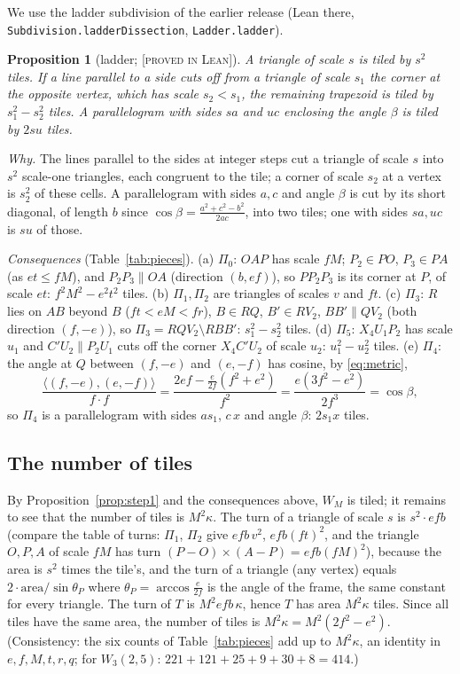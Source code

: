 \documentclass[11pt,reqno]{amsart}
\theoremstyle{plain}
\newtheorem{proposition}[theorem]{Proposition}
\theoremstyle{definition}
\newcommand{\lab}[1]{\textup{[\textsc{#1}]}}
\newcommand{\PL}{\lab{proved in Lean}}
\begin{document}
We use the ladder subdivision of the earlier release (Lean there, \texttt{Subdivision.ladderDissection}, \texttt{Ladder.ladder}).
\begin{proposition}[ladder; \PL{}]\label{prop:ladder}
A triangle of scale $s$ is tiled by $s^2$ tiles. If a line parallel to a side cuts off from a triangle of scale $s_1$ the corner at the opposite vertex, which has scale $s_2<s_1$, the remaining trapezoid is tiled by $s_1^2-s_2^2$ tiles. A parallelogram with sides $sa$ and $uc$ enclosing the angle $\beta$ is tiled by $2su$ tiles.
\end{proposition}
\noindent\emph{Why.} The lines parallel to the sides at integer steps cut a triangle of scale $s$ into $s^2$ scale-one triangles, each congruent to the tile; a corner of scale $s_2$ at a vertex is $s_2^2$ of these cells. A parallelogram with sides $a,c$ and angle $\beta$ is cut by its short diagonal, of length $b$ since $\cos\beta=\frac{a^2+c^2-b^2}{2ac}$, into two tiles; one with sides $sa,uc$ is $su$ of those.

\emph{Consequences} (Table~\ref{tab:pieces}). (a) $\Pi_0$: $OAP$ has scale $fM$; $P_2\in PO$, $P_3\in PA$ (as $et\le fM$), and $P_2P_3\parallel OA$ (direction $(b,ef)$), so $PP_2P_3$ is its corner at $P$, of scale $et$: $f^2M^2-e^2t^2$ tiles. (b) $\Pi_1,\Pi_2$ are triangles of scales $v$ and $ft$. (c) $\Pi_3$: $R$ lies on $AB$ beyond $B$ ($ft<eM<fr$), $B\in RQ$, $B'\in RV_2$, $BB'\parallel QV_2$ (both direction $(f,-e)$), so $\Pi_3=RQV_2\setminus RBB'$: $s_1^2-s_2^2$ tiles. (d) $\Pi_5$: $X_4U_1P_2$ has scale $u_1$ and $C'U_2\parallel P_2U_1$ cuts off the corner $X_4C'U_2$ of scale $u_2$: $u_1^2-u_2^2$ tiles. (e) $\Pi_4$: the angle at $Q$ between $(f,-e)$ and $(e,-f)$ has cosine, by \eqref{eq:metric},
\[
\frac{\langle(f,-e),(e,-f)\rangle}{f\cdot f}=\frac{2ef-\frac{e}{2f}(f^2+e^2)}{f^2}=\frac{e(3f^2-e^2)}{2f^3}=\cos\beta,
\]
so $\Pi_4$ is a parallelogram with sides $a s_1$, $c\,x$ and angle $\beta$: $2s_1x$ tiles.

\subsection{The number of tiles}
By Proposition~\ref{prop:step1} and the consequences above, $W_M$ is tiled; it remains to see that the number of tiles is $M^2\kappa$. The turn of a triangle of scale $s$ is $s^2\cdot efb$ (compare the table of turns: $\Pi_1$, $\Pi_2$ give $efb\,v^2$, $efb(ft)^2$, and the triangle $O,P,A$ of scale $fM$ has turn $(P-O)\times(A-P)=efb(fM)^2$), because the area is $s^2$ times the tile's, and the turn of a triangle (any vertex) equals $2\cdot\mathrm{area}/\sin\theta_P$ where $\theta_P=\arccos\frac e{2f}$ is the angle of the frame, the same constant for every triangle. The turn of $T$ is $M^2efb\,\kappa$, hence $T$ has area $M^2\kappa$ tiles. Since all tiles have the same area, the number of tiles is $M^2\kappa=M^2(2f^2-e^2)$. (Consistency: the six counts of Table~\ref{tab:pieces} add up to $M^2\kappa$, an identity in $e,f,M,t,r,q$; for $W_3(2,5)$: $221+121+25+9+30+8=414$.)
\end{document}
